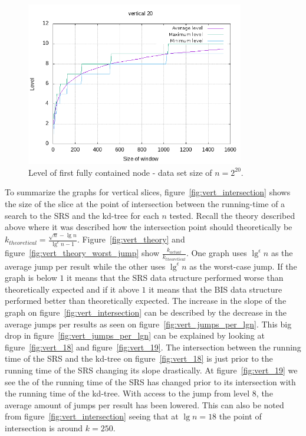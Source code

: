 \begin{figure}[h]
    \centering
    \includegraphics[width = 0.85\textwidth]{pictures/analysis/level_vert_20.png}
    \caption{Level of first fully contained node - data set size of $n=2^{20}$.}\label{fig:level_vert_20}
\end{figure}


To summarize the graphs for vertical slices, figure~\ref{fig:vert_intersection} shows the size of the slice at the point of intersection between the running-time of a search to the SRS and the kd-tree for each $n$ tested. Recall the theory described above where it was described how the intersection point should theoretically be $k_{theoretical} = \frac{\sqrt{n} - \lg n}{\lg^\epsilon n - 1}$. Figure~\ref{fig:vert_theory} and figure~\ref{fig:vert_theory_worst_jump} show $\frac{k_{actual}}{k_{theoretical}}$. One graph uses $\lg^\epsilon n$ as the average jump per result while the other uses $\lg^\epsilon n$ as the worst-case jump. If the graph is below $1$ it means that the SRS data structure performed worse than theoretically expected and if it above $1$ it means that the BIS data structure performed better than theoretically expected. The increase in the slope of the graph on figure~\ref{fig:vert_intersection} can be described by the decrease in the average jumps per results as seen on figure~\ref{fig:vert_jumps_per_lgn}. This big drop in figure~\ref{fig:vert_jumps_per_lgn} can be explained by looking at figure~\ref{fig:vert_18} and figure~\ref{fig:vert_19}. The intersection between the running time of the SRS and the kd-tree on figure~\ref{fig:vert_18} is just prior to the running time of the SRS changing its slope drastically. At figure~\ref{fig:vert_19} we see the of the running time of the SRS has changed prior to its intersection with the running time of the kd-tree. With access to the jump from level $8$, the average amount of jumps per result has been lowered. This can also be noted from figure~\ref{fig:vert_intersection} seeing that at $\lg n = 18$ the point of intersection is around $k=250$.

